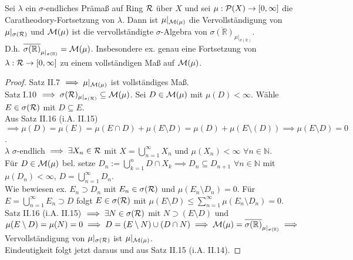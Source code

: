   \begin{theorem}[i.A. II.16]
    Sei $\lambda$ ein $\sigma$-endliches Prämaß auf Ring $\mathcal{R}$ über $X$ und sei $\mu: \mathcal{P}(X) \to [0,\infty]$ die Caratheodory-Fortsetzung von $\lambda$. Dann ist $\mu|_{\mathcal{M}(\mu)}$ die Vervollständigung von $\mu|_{\sigma(\mathcal{R})}$ und $\mathcal{M}(\mu)$ ist die vervollständigte $\sigma$-Algebra von $\overline{\sigma(\mathbb{R})}_{\mu|_{\sigma(\mathbb{R})}}$.\\
    D.h. $\overline{\sigma(\mathbb{R})}_{\mu|_{\sigma(\mathbb{R})}} = \mathcal{M}(\mu)$. Insbesondere ex. genau eine Fortsetzung von $\lambda: \mathcal{R} \to [0, \infty]$ zu einem vollständigen Maß auf $\mathcal{M}(\mu)$.
  \end{theorem}

  \begin{proof}
    Satz II.7 $\implies \mu|_{\mathcal{M}(\mu)}$ ist vollständiges Maß. \\
    Satz I.10 $\implies \sigma(\mathcal{R})_{\mu|_{\sigma(\mathcal{R})}} \subseteq \mathcal{M}(\mu)$. Sei $D \in \mathcal{M}(\mu)$ mit $\mu(D) < \infty$. Wähle $E \in \sigma(\mathcal{R})$ mit $D \subseteq E$. \\ Aus Satz II.16 (i.A. II.15) $\implies \mu(D) = \mu(E) = \mu(E\cap D) + \mu(E\setminus D) = \mu(D) + \mu(E\setminus(D)) \implies \mu(E\setminus D) = 0$. \\
    $\lambda$ $\sigma$-endlich $\implies \exists X_n \in \mathcal{R}$ mit $X = \bigcup\limits_{n=1}^{\infty}X_n$ und $\mu(X_n) < \infty$ $\forall n\in\mathbb{N}$. \\
    Für $D \in \mathcal{M}(\mu)$ bel. setze $D_n := \bigcup\limits_{k=1}^{n} D \cap X_k \implies D_n \subseteq D_{n+1}$ $\forall n \in \mathbb{N}$ mit $\mu(D_n) < \infty$, $D = \bigcup\limits_{n=1}^{\infty}D_n$. \\
    Wie bewiesen ex. $E_n \supset D_n$ mit $E_n \in \sigma(\mathcal{R})$ und $\mu(E_n\setminus D_n) = 0$. Für $E = \bigcup\limits_{n=1}^{\infty}E_n \supset D$ folgt $E \in \sigma(\mathcal{R})$ mit $\mu(E\setminus D) \leq \sum\limits_{n=1}^{\infty}\mu(E_n \setminus D_n)=0$. \\
    Satz II.16 (i.A. II.15) $\implies \exists N \in \sigma(\mathcal{R})$ mit $N \supset (E\setminus D)$ und $\mu(E\setminus D) = \mu(N)=0 \implies D = (E\setminus N) \cup (D \cap N) \implies \mathcal{M}(\mu) = \overline{\sigma(\mathbb{R})}_{\mu|_{\sigma(\mathbb{R})}} \implies$ Vervollständigung von $\mu|_{\sigma(\mathcal{R})}$ ist $\mu|_{\mathcal{M}(\mu)}$. \\
    Eindeutigkeit folgt jetzt daraus und aus Satz II.15 (i.A. II.14).
  \end{proof}

